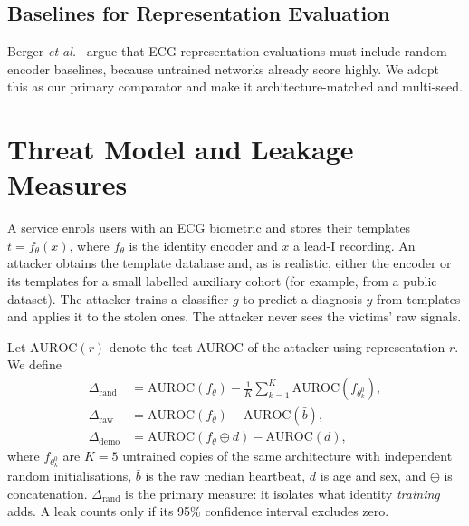 \documentclass[journal]{IEEEtran}
\newcommand{\drand}{\Delta_{\mathrm{rand}}}
\newcommand{\dsig}{\Delta_{\mathrm{raw}}}
\newcommand{\ddemo}{\Delta_{\mathrm{demo}}}
\begin{document}
\subsection{Baselines for Representation Evaluation}
Berger \emph{et al.}~\cite{berger2026position} argue that ECG representation evaluations must include random-encoder baselines, because untrained networks already score highly. We adopt this as our primary comparator and make it architecture-matched and multi-seed.

\section{Threat Model and Leakage Measures}\label{sec:threat}
A service enrols users with an ECG biometric and stores their templates $t=f_\theta(x)$, where $f_\theta$ is the identity encoder and $x$ a lead-I recording. An attacker obtains the template database and, as is realistic, either the encoder or its templates for a small labelled auxiliary cohort (for example, from a public dataset). The attacker trains a classifier $g$ to predict a diagnosis $y$ from templates and applies it to the stolen ones. The attacker never sees the victims' raw signals.

Let $\mathrm{AUROC}(r)$ denote the test AUROC of the attacker using representation $r$. We define
\begin{align}
\drand &= \mathrm{AUROC}(f_\theta) - \frac{1}{K}\sum_{k=1}^{K}\mathrm{AUROC}(f_{\theta_k^0}),\label{eq:drand}\\
\dsig &= \mathrm{AUROC}(f_\theta) - \mathrm{AUROC}(\bar{b}),\\
\ddemo &= \mathrm{AUROC}(f_\theta \oplus d) - \mathrm{AUROC}(d),
\end{align}
where $f_{\theta_k^0}$ are $K=5$ untrained copies of the same architecture with independent random initialisations, $\bar b$ is the raw median heartbeat, $d$ is age and sex, and $\oplus$ is concatenation. $\drand$ is the primary measure: it isolates what identity \emph{training} adds. A leak counts only if its 95\% confidence interval excludes zero.
\end{document}
